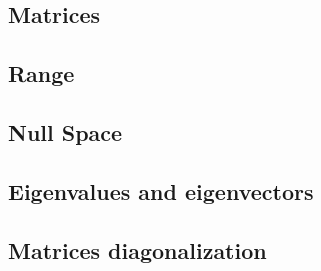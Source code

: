 \subsection{Matrices}
\subsection{Range}
\subsection{Null Space}
\subsection{Eigenvalues and eigenvectors}
\subsection{Matrices diagonalization}